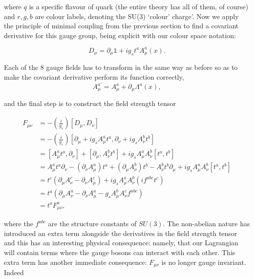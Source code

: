 where $q$ is a specific flavour of quark (the entire theory has all of them, of course) and $r,g,b$ are colour labels, denoting the SU(3) `colour' charge'. Now we apply the principle of minimal coupling from the previous section to find a covariant derivative for this gauge group, being explicit with our colour space notation:

\begin{equation}
D_\mu = \partial_\mu \mathbb{1} + i g_s t^a A^a_\mu(x).
\end{equation}

Each of the 8 gauge fields has to transform in the same way as before so as to make the covariant derivative perform its function correctly,
\begin{equation}
A_\mu^{a'} = A^a_\mu + \partial_\mu \Lambda^a(x),
\end{equation}

and the final step is to construct the field strength tensor

\begin{equation}
\begin{split}
F_{\mu \nu} &= -\left(\frac{i}{g_s}\right) [D_\mu, D_\nu] \\
& =-\left(\frac{i}{g_s}\right) [\partial_\mu + i g_s A_\mu^a t^a, \partial_\nu + i g_s A_\nu^b t^b] \\
&= [A_\mu^a t^a, \partial_\nu] + [\partial_\mu, A_\nu^b t^b] + i g_s A^a_\mu A_\nu^b[t^a, t^b] \\
&= A^a_\mu t^a \partial_\nu - (\partial_\nu A_\mu^a) t^a + (\partial_\mu A_\nu^b) t^b - A_\nu^b t^b \partial_\mu + i g_s A^a_\mu A_\nu^b [t^a, t^b] \\
&= t^c( \partial_\mu A_\nu^c - \partial_\nu A_\mu^c) + i g_s A_\mu^a A_\nu^b (i f^{abc}t^c) \\
&= t^a( \partial_\mu A_\nu^a - \partial_\nu A_\mu^a - g_s A_\mu^b A_\nu^c f^{abc}) \\
&= t^a F_{\mu \nu}^a,
\end{split}
\end{equation}

where the $f^{abc}$ are the structure constants of $SU(3)$. The non-abelian nature has introduced an extra term alongside the derivatives in the field strength tensor and this has an interesting physical consequence: namely, that our Lagrangian will contain terms where the gauge bosons can interact with each other. This extra term has another immediate consequence: $F_{\mu \nu}$ is no longer gauge invariant. Indeed

